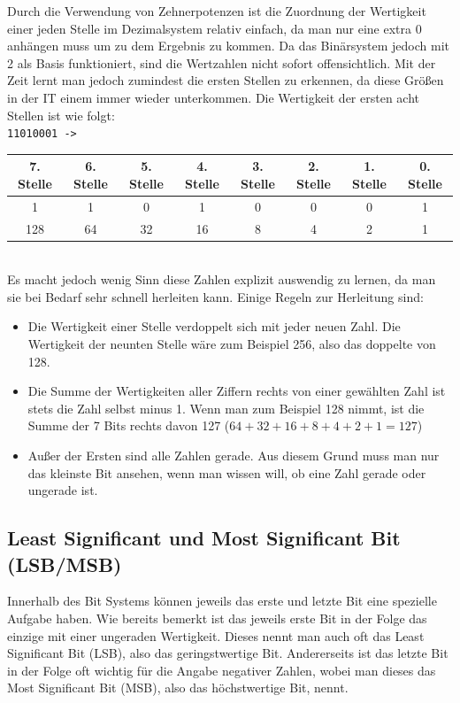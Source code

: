 \documentclass{article}
\begin{document}
	Durch die Verwendung von Zehnerpotenzen ist die Zuordnung der Wertigkeit einer jeden Stelle im Dezimalsystem relativ einfach, da man nur eine extra 0 anhängen muss um zu dem Ergebnis zu kommen. Da das Binärsystem jedoch mit 2 als Basis funktioniert, sind die Wertzahlen nicht sofort offensichtlich. Mit der Zeit lernt man jedoch zumindest die ersten Stellen zu erkennen, da diese Größen in der IT einem immer wieder unterkommen. Die Wertigkeit der ersten acht Stellen ist wie folgt: \\
	\verb|11010001 -> |
	\begin{tabular}{ c c c c c c c c}
		\toprule
		7. Stelle & 6. Stelle & 5. Stelle & 4. Stelle & 3. Stelle & 2. Stelle & 1. Stelle & 0. Stelle \\ \midrule
		1 & 1 & 0 & 1 & 0 & 0 & 0 & 1 \\ \hline
		128 & 64 & 32 & 16 & 8 & 4 & 2 & 1 \\
		\bottomrule
	\end{tabular} \\
	Es macht jedoch wenig Sinn diese Zahlen explizit auswendig zu lernen, da man sie bei Bedarf sehr schnell herleiten kann. Einige Regeln zur Herleitung sind:
	\begin{itemize}
		\item{Die Wertigkeit einer Stelle verdoppelt sich mit jeder neuen Zahl. Die Wertigkeit der neunten Stelle wäre zum Beispiel 256, also das doppelte von 128.}
		\item{Die Summe der Wertigkeiten aller Ziffern rechts von einer gewählten Zahl ist stets die Zahl selbst minus 1. Wenn man zum Beispiel 128 nimmt, ist die Summe der 7 Bits rechts davon 127 ($64+32+16+8+4+2+1 = 127$)}
		\item{Außer der Ersten sind alle Zahlen gerade. Aus diesem Grund muss man nur das kleinste Bit ansehen, wenn man wissen will, ob eine Zahl gerade oder ungerade ist.}
	\end{itemize}
	\subsection{Least Significant und Most Significant Bit (LSB/MSB)}
	Innerhalb des Bit Systems können jeweils das erste und letzte Bit eine spezielle Aufgabe haben. Wie bereits bemerkt ist das jeweils erste Bit in der Folge das einzige mit einer ungeraden Wertigkeit. Dieses nennt man auch oft das Least Significant Bit (LSB), also das geringstwertige Bit. Andererseits ist das letzte Bit in der Folge oft wichtig für die Angabe negativer Zahlen, wobei man dieses das Most Significant Bit (MSB), also das höchstwertige Bit, nennt.
\end{document}
